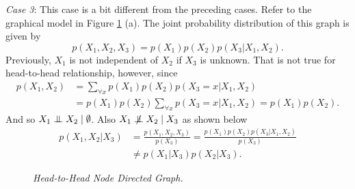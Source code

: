 \begin{exmp}
\textit{Case 3}: This case is a bit different from the preceding cases. Refer to the graphical model in Figure \ref{fig:case3} (a). The joint probability distribution of this graph is given by
$$
 p(X_1,X_2,X_3)= p(X_1) p(X_2) p(X_3|X_1,X_2).
$$
Previously, $X_1$ is not independent of $X_2$ if $X_3$ is unknown. That is not true for head-to-head relationship, however, since\vspace{.2cm}
$$
\begin{aligned}
 p(X_1,X_2)&=\sum_{\forall x} p(X_1) p(X_2) p(X_3=x|X_1,X_2)\\
&= p(X_1) p(X_2)\sum_{\forall x} p(X_3=x|X_1,X_2)= p(X_1) p(X_2).
\end{aligned}
$$
And so $X_1\mathrel{\perp\mspace{-10mu}\perp} X_2\mid \emptyset$. Also $X_1\nCI X_2\mid X_3$ as shown below\vspace{.2cm}
$$
\begin{aligned}
 p(X_1,X_2|X_3)&=\frac{ p(X_1,X_2,X_3)}{ p(X_3)}=\frac{ p(X_1) p(X_2) p(X_3|X_1,X_2)}{ p(X_3)}\\
&\neq p(X_1|X_3) p(X_2|X_3).
\end{aligned}
$$
\begin{figure}
\begin{minipage}[c]{\textwidth}
\centering
\begin{subfigure}[b]{.5\textwidth}
\centering
{}
\end{subfigure}\hspace{-1cm}
\begin{subfigure}[b]{.5\textwidth}
\centering
{}
\end{subfigure}
\end{minipage}
\caption[Head-to-Head Node Directed Graph]{\it Head-to-Head Node Directed Graph.}
\label{fig:case3}
\end{figure}
\end{exmp}
